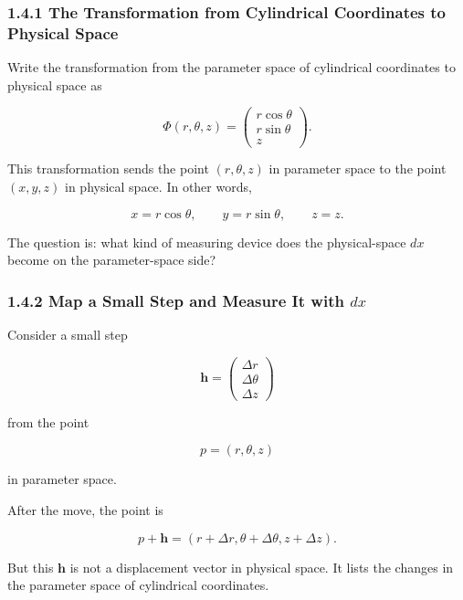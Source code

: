 \documentclass[a4paper,12pt,openany]{book}
\begin{document}
\hypertarget{the-transformation-from-cylindrical-coordinates-to-physical-space}{%
\subsubsection{1.4.1 The Transformation from Cylindrical Coordinates to
Physical
Space}\label{the-transformation-from-cylindrical-coordinates-to-physical-space}}

Write the transformation from the parameter space of cylindrical
coordinates to physical space as

\[
\Phi(r,\theta,z)
=
\begin{pmatrix}
r\cos\theta\\
r\sin\theta\\
z
\end{pmatrix}.
\]

This transformation sends the point \((r,\theta,z)\) in parameter space
to the point \((x,y,z)\) in physical space. In other words,

\[
x=r\cos\theta,\qquad
y=r\sin\theta,\qquad
z=z.
\]

The question is: what kind of measuring device does the physical-space
\(dx\) become on the parameter-space side?

\hypertarget{map-a-small-step-and-measure-it-with-dx}{%
\subsubsection{\texorpdfstring{1.4.2 Map a Small Step and Measure It
with
\(dx\)}{1.4.2 Map a Small Step and Measure It with dx}}\label{map-a-small-step-and-measure-it-with-dx}}

Consider a small step

\[
\mathbf h
=
\begin{pmatrix}
\Delta r\\
\Delta\theta\\
\Delta z
\end{pmatrix}
\]

from the point

\[
p=(r,\theta,z)
\]

in parameter space.

After the move, the point is

\[
p+\mathbf h
=
(r+\Delta r,\theta+\Delta\theta,z+\Delta z).
\]

But this \(\mathbf h\) is not a displacement vector in physical space.
It lists the changes in the parameter space of cylindrical coordinates.
\end{document}
